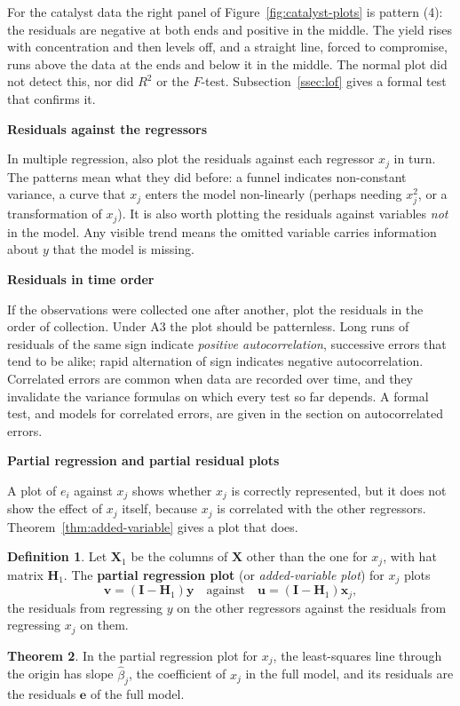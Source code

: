 \documentclass[11pt,a4paper]{article}
\numberwithin{equation}{section}
\theoremstyle{definition}
\newtheorem{thm}{Theorem}[subsection]
\newtheorem{defn}[thm]{Definition}
\newcommand{\subhead}[1]{%
  \par\medskip\noindent\textbf{#1}\par\nobreak\smallskip}
\begin{document}
For the catalyst data the right panel of Figure~\ref{fig:catalyst-plots} is pattern (4):
the residuals are negative at both ends and positive in the middle. The yield rises with
concentration and then levels off, and a straight line, forced to compromise, runs above
the data at the ends and below it in the middle. The normal plot did not detect this, nor
did $R^2$ or the $F$-test. Subsection~\ref{ssec:lof} gives a formal test that confirms
it.

\subhead{Residuals against the regressors}
In multiple regression, also plot the residuals against each regressor $x_j$ in turn. The
patterns mean what they did before: a funnel indicates non-constant variance, a curve that
$x_j$ enters the model non-linearly (perhaps needing $x_j^2$, or a transformation of
$x_j$). It is also worth plotting the residuals against variables \emph{not} in the model.
Any visible trend means the omitted variable carries information about $y$ that the model
is missing.

\subhead{Residuals in time order}
If the observations were collected one after another, plot the residuals in the order of
collection. Under A3 the plot should be patternless. Long runs of residuals of the same
sign indicate \emph{positive autocorrelation}, successive errors that tend to be alike;
rapid alternation of sign indicates negative autocorrelation. Correlated errors are common
when data are recorded over time, and they invalidate the variance formulas on which every
test so far depends. A formal test, and models for correlated errors, are given in the
section on autocorrelated errors.

\subhead{Partial regression and partial residual plots}
A plot of $e_i$ against $x_j$ shows whether $x_j$ is correctly represented, but it does not
show the effect of $x_j$ itself, because $x_j$ is correlated with the other regressors.
Theorem~\ref{thm:added-variable} gives a plot that does.

\begin{defn}
Let $\mathbf{X}_1$ be the columns of $\mathbf{X}$ other than the one for $x_j$, with hat
matrix $\mathbf{H}_1$. The \textbf{partial regression plot} (or \emph{added-variable plot})
for $x_j$ plots
\[
\mathbf{v} = (\mathbf{I} - \mathbf{H}_1)\mathbf{y}
\quad\text{against}\quad
\mathbf{u} = (\mathbf{I} - \mathbf{H}_1)\mathbf{x}_j ,
\]
the residuals from regressing $y$ on the other regressors against the residuals from
regressing $x_j$ on them.
\end{defn}

\begin{thm}\label{thm:added-variable-plot}
In the partial regression plot for $x_j$, the least-squares line through the origin has
slope $\hat\beta_j$, the coefficient of $x_j$ in the full model, and its residuals are the
residuals $\mathbf{e}$ of the full model.
\end{thm}
\end{document}
